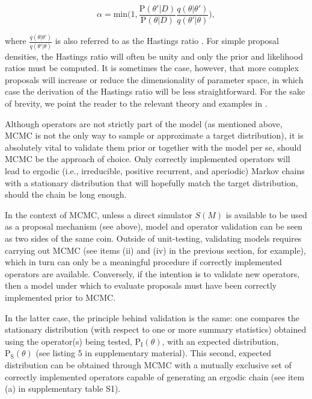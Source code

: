 \documentclass[oneside]{article}
\begin{document}
\begin{equation}
  \alpha = \text{min}\bigg(1, \frac{\text{P}(\theta'|D)}{\text{P}(\theta|D)} \frac{q(\theta|\theta')}{q(\theta'|\theta)} \bigg),
\end{equation}

\noindent where $\frac{q(\theta|\theta')}{q(\theta'|\theta)}$ is also
referred to as the Hastings ratio \citep{smith93,tierney94,gelman}.
For simple proposal densities, the Hastings ratio will often be unity and
only the prior and likelihood ratios must be computed.
It is sometimes the case, however, that more complex proposals will
increase or reduce the dimensionality of parameter space, in which
case the derivation of the Hastings ratio will be less straightforward.
For the sake of brevity, we point the reader to the relevant theory
and examples in \citep{green95,huelsenbeck04,drummond10}.

Although operators are not strictly part of the model (as mentioned
above, MCMC is not the only way to sample or approximate a target
distribution), it is absolutely vital to validate them prior or
together with the model per se, should MCMC be the approach of choice.
Only correctly implemented operators will lead to ergodic (i.e.,
irreducible, positive recurrent, and aperiodic) Markov
chains with a stationary distribution that will hopefully match
the target distribution, should the chain be long enough.

In the context of MCMC, unless a direct simulator $S(M)$ is
available to be used as a proposal mechanism (see above), model and operator
validation can be seen as two sides of the same coin.
Outside of unit-testing, validating models requires carrying out MCMC
(see items (ii) and (iv) in the previous section, for example), which
in turn can only be a meaningful procedure if correctly implemented
operators are available.
Conversely, if the intention is to validate new operators, then a
model under which to evaluate proposals must have been correctly
implemented prior to MCMC.

In the latter case, the principle behind validation is the same: one
compares the stationary distribution (with respect to one or more summary
statistics) obtained using the operator(s)
being tested, $\text{P}_{\text{I}}(\theta)$, with an expected
distribution, $\text{P}_{\text{S}}(\theta)$ (see listing 5 in
supplementary material). 
This second, expected distribution can be obtained through MCMC with a
mutually exclusive set of correctly implemented operators capable of
generating an ergodic chain (see item
(a) in supplementary table S1). 
\end{document}
